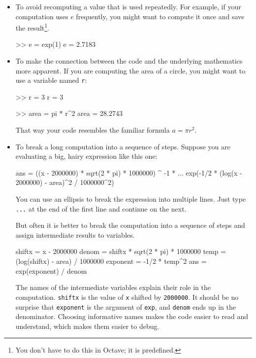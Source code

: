 \documentclass[
]{book}
\numberwithin{Answer}{chapter}
\numberwithin{Exercise}{chapter}
\begin{document}
\begin{itemize}

\item To avoid recomputing a value that is used repeatedly.  For
example, if your computation uses $e$ frequently, you might
want to compute it once and save the result\footnote{You don't have to do this in Octave; it is predefined.}.

\begin{code}
>> e = exp(1)
e = 2.7183
\end{code}

\item To make the connection between the code and the underlying
mathematics more apparent.  If you are computing the area of a circle,
you might want to use a variable named {\tt r}:

\begin{code}
>> r = 3
r = 3

>> area = pi * r^2
area = 28.2743
\end{code}

That way your code resembles the familiar formula $a = \pi r^2$.

\item To break a long computation into a sequence of steps.
Suppose you are evaluating a big, hairy expression like this one:
\begin{code}
ans = ((x - 2000000) * sqrt(2 * pi) * 1000000) ^ -1 * ...
exp(-1/2 * (log(x - 2000000) - area)^2 / 1000000^2)
\end{code}

You can use an ellipsis to break the expression into multiple lines.
Just type {\tt ...} at the end of the first line and continue on the
next.


But often it is better to break the computation into a sequence of
steps and assign intermediate results to variables.

\begin{code}
shiftx = x - 2000000
denom = shiftx * sqrt(2 * pi) * 1000000
temp = (log(shiftx) - area) / 1000000
exponent = -1/2 * temp^2
ans = exp(exponent) / denom
\end{code}

The names of the intermediate variables explain their role in the
computation.  {\tt shiftx} is the value of {\tt x} shifted by 
{\tt 2000000}.  It should be no surprise that {\tt exponent} is the argument of {\tt exp}, and {\tt denom} ends up in the denominator.  Choosing informative names makes the code easier to read and understand, which makes them easier to debug.


\end{itemize}
\end{document}

